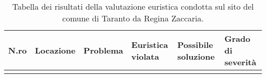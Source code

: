 \begin{longtable}[c]{@{}m{1cm}llllm{2cm}@{}}
	\caption{Tabella dei risultati della valutazione euristica condotta sul sito del comune di Taranto da Regina Zaccaria.}
	\label{tab:val-euristica-ReginaZaccaria}\\
	\toprule
	N.ro & Locazione & Problema & Euristica violata & Possibile soluzione & Grado di severità\footnotemark \\* \midrule
	\endhead
\\*
	\bottomrule
\end{longtable}
